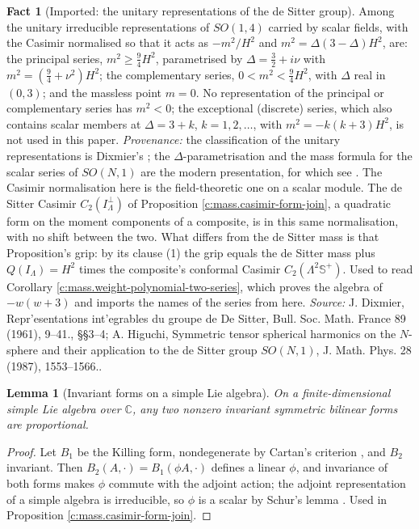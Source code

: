 \documentclass[11pt]{article}
\newtheorem{lemma}[theorem]{Lemma}
\theoremstyle{definition}
\newtheorem{fact}[theorem]{Fact}
\theoremstyle{plain}
\newcommand{\changedmark}[2]{\marginpar{\raggedright\scriptsize\color{#1}#2}}
\providecommand{\C}{}\renewcommand{\C}{\mathbb{C}}
\providecommand{\CS}{}\renewcommand{\CS}{{\mathbb{S}^{+}}}
\begin{document}
\begin{fact}[Imported: the unitary representations of the de Sitter group]\label{c:mass.imported-unitary-representations-de-sitter-group}
\changedmark{BrickRed}{corrected since the deposit}
Among the unitary irreducible representations of $SO(1,4)$ carried by scalar fields, with the Casimir normalised so that it acts as $-m^{2}/H^{2}$ and $m^{2} = \Delta(3-\Delta)H^{2}$, are: the principal series, $m^{2} \ge \tfrac94 H^{2}$, parametrised by $\Delta = \tfrac32 + i\nu$ with $m^{2} = (\tfrac94 + \nu^{2})H^{2}$; the complementary series, $0 < m^{2} < \tfrac94 H^{2}$, with $\Delta$ real in $(0,3)$; and the massless point $m = 0$. No representation of the principal or complementary series has $m^{2} < 0$; the exceptional (discrete) series, which also contains scalar members at $\Delta = 3 + k$, $k = 1, 2, \dots$, with $m^{2} = -k(k+3)H^{2}$, is not used in this paper. \emph{Provenance:} the classification of the unitary representations is Dixmier's \cite[\S\S3--4]{Dixmier1961}; the $\Delta$-parametrisation and the mass formula for the scalar series of $SO(N,1)$ are the modern presentation, for which see \cite{Higuchi1987}. The Casimir normalisation here is the field-theoretic one on a scalar module. The de Sitter Casimir $C_{2}(I_{\Lambda}^{\perp})$ of Proposition \ref{c:mass.casimir-form-join}, a quadratic form on the moment components of a composite, is in this same normalisation, with no shift between the two. What differs from the de Sitter mass is that Proposition's grip: by its clause (1) the grip equals the de Sitter mass plus $Q(I_{\Lambda}) = H^{2}$ times the composite's conformal Casimir $C_{2}(\Lambda^{2}\CS)$. Used to read Corollary \ref{c:mass.weight-polynomial-two-series}, which proves the algebra of $-w(w+3)$ and imports the names of the series from here.
\emph{Source:} J. Dixmier, Repr'esentations int'egrables du groupe de De Sitter, Bull. Soc. Math. France 89 (1961), 9--41., \S\S3--4; A. Higuchi, Symmetric tensor spherical harmonics on the $N$-sphere and their application to the de Sitter group $SO(N,1)$, J. Math. Phys. 28 (1987), 1553--1566..
\end{fact}

\begin{lemma}[Invariant forms on a simple Lie algebra]\label{c:mass.invariant-forms-simple-lie-algebra}
On a finite-dimensional simple Lie algebra over $\C$, any two nonzero invariant symmetric bilinear forms are proportional.
\end{lemma}
\begin{proof}
Let $B_{1}$ be the Killing form, nondegenerate by Cartan's criterion \cite[\S5.1]{Humphreys1972}, and $B_{2}$ invariant. Then $B_{2}(A, \cdot) = B_{1}(\phi A, \cdot)$ defines a linear $\phi$, and invariance of both forms makes $\phi$ commute with the adjoint action; the adjoint representation of a simple algebra is irreducible, so $\phi$ is a scalar by Schur's lemma \cite[\S6.1]{Humphreys1972}. Used in Proposition \ref{c:mass.casimir-form-join}.

\end{proof}
\end{document}
